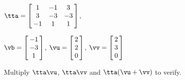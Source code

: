 {$\tta = \left[\hskip -3pt \begin{array}{ccc} 1 & -1 & 3 \\    3&-3&-3\\    -1&1&1 \end{array}\hskip -3pt \right] $, 

$\vb=\left[\hskip -3pt \begin{array}{c} -1\\    -3 \\    1 \end{array}\hskip -3pt \right] $, 
$\vu = \left[\hskip -3pt \begin{array}{c} 2 \\ 2 \\ 0  \end{array}\hskip -3pt \right]$, 
$\vv = \left[\hskip -3pt \begin{array}{c} 2\\ 3 \\ 0  \end{array}\hskip -3pt \right] $}
{Multiply $\tta\vu$, $\tta\vv$ and $\tta(\vu+\vv)$ to verify.}
